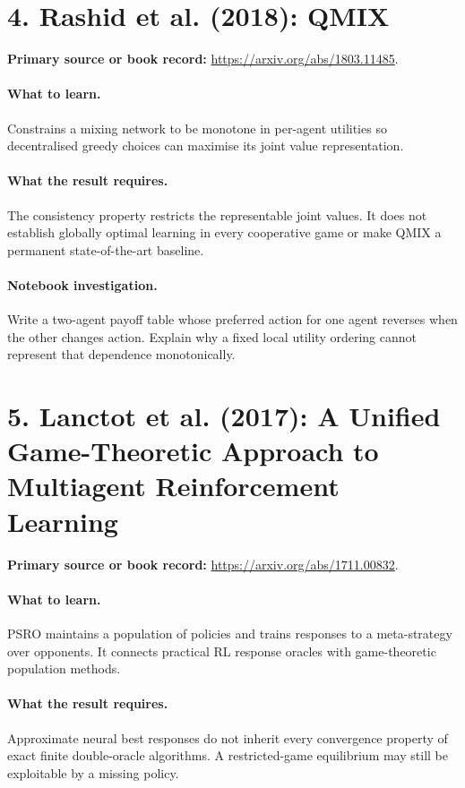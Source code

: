 \documentclass[11pt]{scrartcl}
\begin{document}
\section*{4. Rashid et al. (2018): QMIX}
\textbf{Primary source or book record:} \url{https://arxiv.org/abs/1803.11485}.

\paragraph{What to learn.} Constrains a mixing network to be monotone in per-agent utilities so decentralised greedy choices can maximise its joint value representation.

\paragraph{What the result requires.} The consistency property restricts the representable joint values. It does not establish globally optimal learning in every cooperative game or make QMIX a permanent state-of-the-art baseline.

\paragraph{Notebook investigation.} Write a two-agent payoff table whose preferred action for one agent reverses when the other changes action. Explain why a fixed local utility ordering cannot represent that dependence monotonically.

\section*{5. Lanctot et al. (2017): A Unified Game-Theoretic Approach to Multiagent Reinforcement Learning}
\textbf{Primary source or book record:} \url{https://arxiv.org/abs/1711.00832}.

\paragraph{What to learn.} PSRO maintains a population of policies and trains responses to a meta-strategy over opponents. It connects practical RL response oracles with game-theoretic population methods.

\paragraph{What the result requires.} Approximate neural best responses do not inherit every convergence property of exact finite double-oracle algorithms. A restricted-game equilibrium may still be exploitable by a missing policy.
\end{document}
